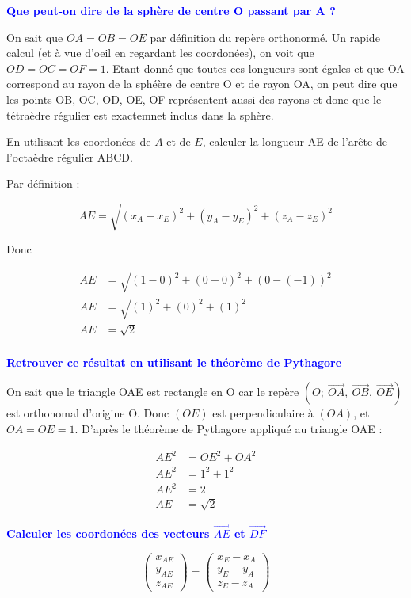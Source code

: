 \documentclass{exam}
\begin{document}
\begin{questions}
  \question[1] \textbf{\textcolor{blue}{Que peut-on dire de la sphère de centre O passant par A ?}}

  On sait que $OA = OB = OE$ par définition du repère orthonormé. Un rapide calcul (et à vue d'oeil en regardant les coordonées), on voit que $OD = OC = OF = 1$. Etant donné que toutes ces longueurs sont égales et que OA correspond au rayon de la sphéère de centre O et de rayon OA, on peut dire que les points OB, OC, OD, OE, OF représentent aussi des rayons et donc que le tétraèdre régulier est exactemnet inclus dans la sphère.

  \question[1] En utilisant les coordonées de $A$ et de $E$, calculer la longueur AE de l'arête de l'octaèdre régulier ABCD.

  Par définition : 

  \[
  AE = \sqrt{(x_A - x_E)^2 + (y_A - y_E)^2 + (z_A - z_E)^2}
  \]

  Donc 

  \begin{align}
    AE &= \sqrt{(1-0)^2 + (0 - 0)^2 + (0 - (-1))^2} \\
    AE &= \sqrt{(1)^2 + (0)^2 + (1)^2} \\
    AE &= \sqrt{2} \\
  \end{align}

  \question[1]\textbf{\textcolor{blue}{Retrouver ce résultat en utilisant le théorème de Pythagore}}

  On sait que le triangle OAE est rectangle en O car le repère $\left(O\mathpunct{} ; \ \overrightarrow{OA}\mathpunct{}, \ \overrightarrow{OB}\mathpunct{}, \ \overrightarrow{OE}\right)$ est orthonomal d'origine O. 
  Donc $(OE)$ est perpendiculaire à $(OA)$, et $OA = OE = 1$. D'après le théorème de Pythagore appliqué au triangle OAE : 

  \begin{align}
  AE^2 &= OE^2 + OA^2 \\
  AE^2 &= 1^2 + 1^2 \\ 
  AE^2 &= 2 \\ 
  AE &= \sqrt{2}
\end{align}

  \question[1] \textbf{\textcolor{blue}{Calculer les coordonées des vecteurs $\overrightarrow{AE}$ et $\overrightarrow{DF}$}}

  \[
  \begin{pmatrix}
    x_{AE} \\
    y_{AE} \\ 
    z_{AE}
  \end{pmatrix}
  = 
  \begin{pmatrix}
    x_{E} - x_{A} \\
    y_{E} - y_{A} \\ 
    z_{E} - z_{A}
  \end{pmatrix}
\]


\end{questions}
\end{document}

